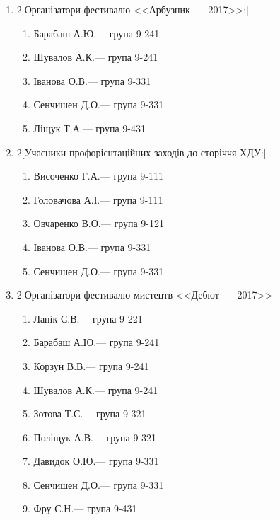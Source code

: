 \documentclass[
	a4paper,
	12pt,
	oneside,
	draft
]{extreport}
\begin{document}
{\begin{enumerate}[label=\Roman*.]
\item \begin{multicols}{2}[Організатори фестивалю <<Арбузник~--- 2017>>:]
\begin{enumerate}[topsep=0pt,itemsep=-1ex,partopsep=1ex,parsep=1ex,label=\arabic*.]
\item Барабаш А.Ю.\hfill --- група 9-241
\item Шувалов А.К.\hfill --- група 9-241
\item Іванова О.В.\hfill --- група 9-331
\item Сенчишен Д.О.\hfill --- група 9-331
\item Ліщук Т.А.\hfill --- група 9-431
\end{enumerate}
\end{multicols}


\item \begin{multicols}{2}[Учасники профорієнтаційних заходів до сторіччя ХДУ:]
\begin{enumerate}[topsep=0pt,itemsep=-1ex,partopsep=1ex,parsep=1ex,label=\arabic*.]
\item Височенко Г.А.\hfill --- група 9-111
\item Головачова А.І.\hfill --- група 9-111
\item Овчаренко В.О.\hfill --- група 9-121
\item Іванова О.В.\hfill --- група 9-331
\item Сенчишен Д.О.\hfill --- група 9-331
\end{enumerate}
\end{multicols}


\item \begin{multicols}{2}[Організатори фестивалю мистецтв <<Дебют~--- 2017>>]
\begin{enumerate}[topsep=0pt,itemsep=-1ex,partopsep=1ex,parsep=1ex,label=\arabic*.]
\item Лапік С.В.\hfill --- група 9-221
\item Барабаш А.Ю.\hfill --- група 9-241
\item Корзун В.В.\hfill --- група 9-241
\item Шувалов А.К.\hfill --- група 9-241
\item Зотова Т.С.\hfill --- група 9-321
\item Поліщук А.В.\hfill --- група 9-321
\item Давидок О.Ю.\hfill --- група 9-331
\item Сенчишен Д.О.\hfill --- група 9-331
\item Фру С.Н.\hfill --- група 9-431
\end{enumerate}
\end{multicols}



\end{enumerate}}
\end{document}
